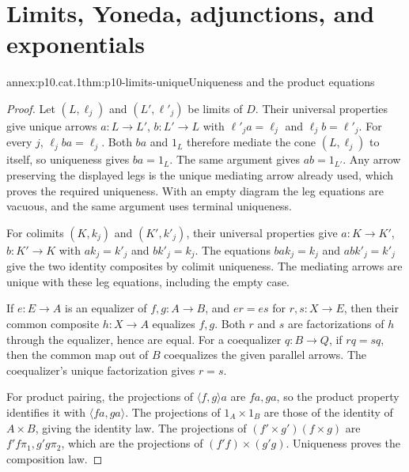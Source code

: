 
\section{Limits, Yoneda, adjunctions, and exponentials}

\begin{annexitem}{annex:p10.cat.1}{thm:p10-limits-unique}{Uniqueness and the product equations}
\begin{proof}
Let \((L,\ell_j)\) and \((L',\ell'_j)\) be limits of \(D\).
Their universal properties give unique arrows
\(a:L\to L'\), \(b:L'\to L\) with
\(\ell'_j a=\ell_j\) and \(\ell_j b=\ell'_j\).
For every \(j\), \(\ell_j b a=\ell_j\).
Both \(b a\) and \(1_L\) therefore mediate the cone
\((L,\ell_j)\) to itself, so uniqueness gives \(b a=1_L\).
The same argument gives \(a b=1_{L'}\).
Any arrow preserving the displayed legs is the unique mediating
arrow already used, which proves the required uniqueness.
With an empty diagram the leg equations are vacuous, and the same
argument uses terminal uniqueness.

For colimits \((K,k_j)\) and \((K',k'_j)\), their universal
properties give \(a:K\to K'\), \(b:K'\to K\) with
\(a k_j=k'_j\) and \(b k'_j=k_j\).
The equations \(b a k_j=k_j\) and \(a b k'_j=k'_j\) give the two
identity composites by colimit uniqueness.  The mediating arrows
are unique with these leg equations, including the empty case.

If \(e:E\to A\) is an equalizer of \(f,g:A\to B\), and \(e r=e s\)
for \(r,s:X\to E\), then their common composite \(h:X\to A\)
equalizes \(f,g\).  Both \(r\) and \(s\) are factorizations of
\(h\) through the equalizer, hence are equal.
For a coequalizer \(q:B\to Q\), if \(r q=s q\), then the common
map out of \(B\) coequalizes the given parallel arrows.  The
coequalizer's unique factorization gives \(r=s\).

For product pairing, the projections of
\(\langle f,g\rangle a\) are \(f a,g a\), so the product property
identifies it with \(\langle f a,g a\rangle\).
The projections of \(1_A\times1_B\) are those of the identity
of \(A\times B\), giving the identity law.
The projections of \((f'\times g')(f\times g)\) are
\(f'f\pi_1,g'g\pi_2\), which are the projections of
\((f'f)\times(g'g)\).  Uniqueness proves the composition law.
\end{proof}
\end{annexitem}

